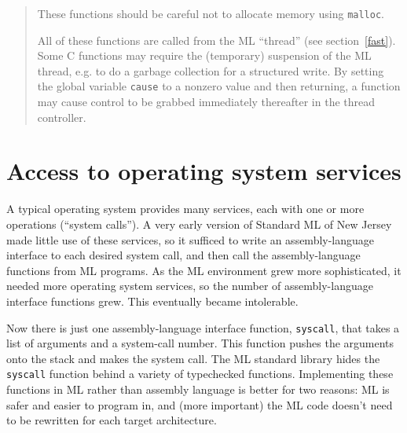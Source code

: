 \begin{quotation}
{These functions should be careful not to allocate memory using \verb"malloc".

All of these functions are called from the ML ``thread'' (see 
section~\ref{fast}).
Some C functions may require the (temporary) suspension of the ML thread,
e.g. to do a garbage collection for a structured write.
By setting the global variable \verb"cause" to a nonzero
value and then returning, a function may cause control to be grabbed
immediately thereafter in the thread controller.
}
\end{quotation}

\section{Access to operating system services}
\label{access}

A typical operating system
provides many services, each with one or
more operations (``system calls'').  A very early version of Standard ML of
New Jersey made little use of these services, so it sufficed to write
an assembly-language interface to each desired system call, and then
call the assembly-language functions from ML programs.  As the ML environment
grew more sophisticated, it needed more operating system services, so the
number of assembly-language interface functions grew.  This eventually
became intolerable.

Now there is just one assembly-language interface function, \verb"syscall",
that takes a list of arguments and a system-call number.  This function
pushes the arguments onto the stack and makes the system call.  The ML standard
library hides the \verb"syscall" function behind a variety of typechecked
functions.  Implementing these functions in ML rather than assembly language
is better for two reasons: ML is safer and easier to program in, and (more
important) the ML code doesn't need to be rewritten for each target
architecture.

